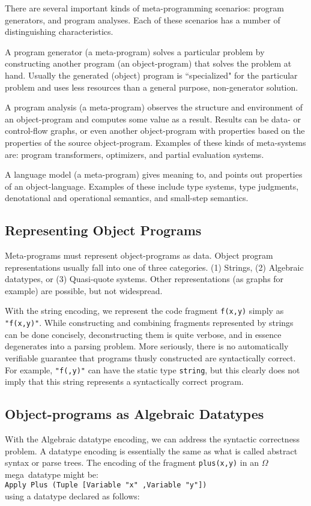 \documentclass[11pt,twoside,A4]{llncs}
\newcommand{\om}{\emph{$\Omega$}mega}
\begin{document}
There are several important kinds of meta-programming scenarios: program generators,
and program analyses. Each of these scenarios has a number of distinguishing
characteristics.

A program generator (a meta-program) solves a particular problem by constructing
another program (an object-program) that solves the problem at hand. Usually the
generated (object) program is ``specialized" for the particular problem and uses
less resources than a general purpose, non-generator solution.

A program analysis (a meta-program) observes the structure and environment of an
object-program and computes some value as a result. Results can be data- or
control-flow graphs, or even another object-program with properties based on the
properties of the source object-program. Examples of these kinds of meta-systems
are: program transformers, optimizers, and partial evaluation systems.

A language model (a meta-program) gives meaning to, and points out properties
of an object-language. Examples of these include type systems, type judgments,
denotational and operational semantics, and small-step semantics.

\subsection{Representing Object Programs}

Meta-programs must represent object-programs as data. Object program
representations usually fall into one of three categories. (1) Strings, (2) Algebraic
datatypes, or (3) Quasi-quote systems. Other representations
(as graphs for example) are possible, but not widespread.

With the string encoding, we represent the code fragment {\tt f(x,y)} simply as
\verb+"f(x,y)"+. While constructing and combining fragments represented by strings can
be done concisely, deconstructing them is quite verbose, and in essence
degenerates into a parsing problem. More seriously, there is
no automatically verifiable guarantee that programs thusly constructed are
syntactically correct. For example, \verb+"f(,y)"+ can have the static type {\tt string}, but
this clearly does not imply that this string represents a syntactically correct
program.

\subsection{Object-programs as Algebraic Datatypes}
With the Algebraic datatype encoding, we can address the syntactic correctness problem. A
datatype encoding is essentially the same as what is called abstract syntax or
parse trees. The encoding of the fragment \verb+plus(x,y)+ in an \om\ datatype might be:\\
{\small \verb+Apply Plus (Tuple [Variable "x" ,Variable "y"])+}\\ using a datatype declared
as follows:
\end{document}

